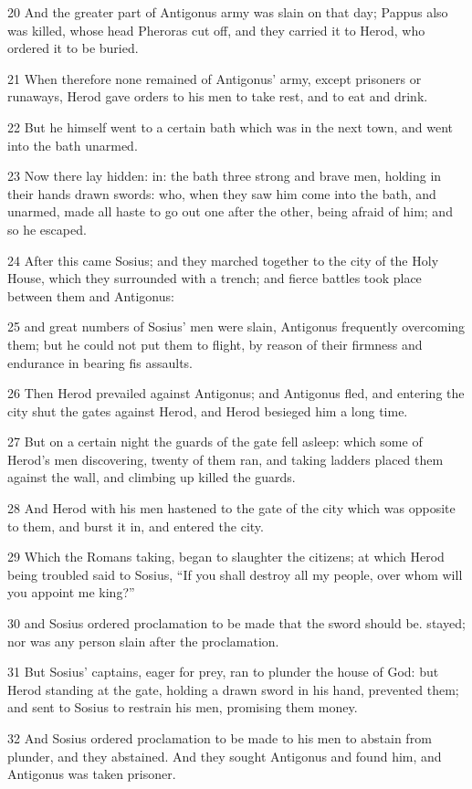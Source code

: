 20 And the greater part of Antigonus army was slain on that day; Pappus also was killed, whose head Pheroras cut off, and they carried it to Herod, who ordered it to be buried. 

21 When therefore none remained of Antigonus’ army, except prisoners or runaways, Herod gave orders to his men to take rest, and to eat and drink. 

22 But he himself went to a certain bath which was in the next town, and went into the bath unarmed. 

23 Now there lay hidden: in: the bath three strong and brave men, holding in their hands drawn swords: who, when they saw him come into the bath, and unarmed, made all haste to go out one after the other, being afraid of him; and so he escaped. 

24 After this came Sosius; and they marched together to the city of the Holy House, which they surrounded with a trench; and fierce battles took place between them and Antigonus: 

25 and great numbers of Sosius’ men were slain, Antigonus frequently overcoming them; but he could not put them to flight, by reason of their firmness and endurance in bearing fis assaults. 

26 Then Herod prevailed against Antigonus; and Antigonus fled, and entering the city shut the gates against Herod, and Herod besieged him a long time. 

27 But on a certain night the guards of the gate fell asleep: which some of Herod’s men discovering, twenty of them ran, and taking ladders placed them against the wall, and climbing up killed the guards. 

28 And Herod with his men hastened to the gate of the city which was opposite to them, and burst it in, and entered the city. 

29 Which the Romans taking, began to slaughter the citizens; at which Herod being troubled said to Sosius, “If you shall destroy all my people, over whom will you appoint me king?” 

30 and Sosius ordered proclamation to be made that the sword should be. stayed; nor was any person slain after the proclamation. 

31 But Sosius’ captains, eager for prey, ran to plunder the house of God: but Herod standing at the gate, holding a drawn sword in his hand, prevented them; and sent to Sosius to restrain his men, promising them money. 

32 And Sosius ordered proclamation to be made to his men to abstain from plunder, and they abstained. And they sought Antigonus and found him, and Antigonus was taken prisoner. 

